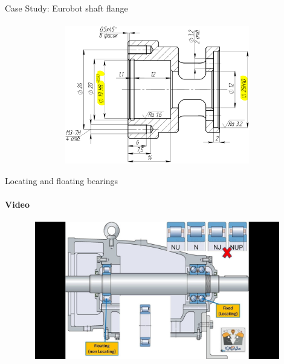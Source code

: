 \documentclass[aspectratio=169]{beamer}
\begin{document}
\begin{frame}[t]{Case Study: Eurobot shaft flange}
\framesubtitle{}
    \vspace{-0.6cm}
    \begin{figure}[H]
        \centering\includegraphics[height=6cm,width=1\textwidth,keepaspectratio]{eurobot.png}
        \label{fig:eurobot.png}
    \end{figure}
\end{frame}

\begin{frame}[t]{Locating and floating bearings}
    \framesubtitle{Video}
    \vspace{-0.6cm}
    \begin{figure}[H]
        \href{https://youtu.be/3vaT1CAhKeQ}{
            \centering\includegraphics[height=6cm,width=1\textwidth,keepaspectratio]{locatingfixedbearings_video.jpg}}
        \label{fig:locatingfixedbearings_video.jpg}
    \end{figure}
\end{frame}
\end{document}
